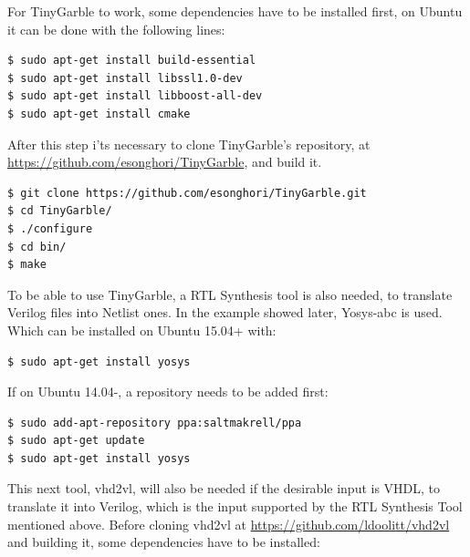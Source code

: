 \begin{refsection}
For TinyGarble to work, some dependencies have to be installed first, on Ubuntu it can be done with the following lines:

\begin{lstlisting}[caption={Installation of TinyGarble's dependencies}, language=bash, captionpos=b] 
$ sudo apt-get install build-essential
$ sudo apt-get install libssl1.0-dev
$ sudo apt-get install libboost-all-dev
$ sudo apt-get install cmake
\end{lstlisting}

After this step i'ts necessary to clone TinyGarble's repository, at \url{https://github.com/esonghori/TinyGarble}, and build it.

\begin{lstlisting}[caption={Configuration and compilation of TinyGarble}, language=bash, captionpos=b] 
$ git clone https://github.com/esonghori/TinyGarble.git
$ cd TinyGarble/
$ ./configure
$ cd bin/
$ make
\end{lstlisting}

To be able to use TinyGarble, a RTL Synthesis tool is also needed, to translate Verilog files into Netlist ones. In the example showed later, Yosys-abc is used. Which can be installed on Ubuntu 15.04+ with:

\begin{lstlisting}[caption={Installation of Yosys-abc for Ubuntu 15.04>}, language=bash, captionpos=b]                                                                                                                                                                
$ sudo apt-get install yosys
\end{lstlisting}

If on Ubuntu 14.04-, a repository needs to be added first:

\begin{lstlisting}[caption={Installation of Yosys-abc for Ubuntu 14.04<}, language=bash, captionpos=b] 
$ sudo add-apt-repository ppa:saltmakrell/ppa
$ sudo apt-get update                                                                                                                                                                                             
$ sudo apt-get install yosys
\end{lstlisting}

This next tool, vhd2vl, will also be needed if the desirable input is VHDL, to translate it into Verilog, which is the input supported by the RTL Synthesis Tool mentioned above.
Before cloning vhd2vl at \url{https://github.com/ldoolitt/vhd2vl} and building it, some dependencies have to be installed:


\end{refsection}
